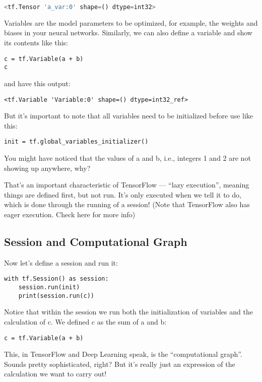 \begin{lstlisting}[language=Python]
<tf.Tensor 'a_var:0' shape=() dtype=int32>
\end{lstlisting}
Variables are the model parameters to be optimized, for example, the weights and biases in your neural networks. Similarly, we can also define a variable and show its contents like this:

\begin{lstlisting}
c = tf.Variable(a + b)
c
\end{lstlisting}
and have this output:

\begin{lstlisting}
<tf.Variable 'Variable:0' shape=() dtype=int32_ref>
\end{lstlisting}
But it's important to note that all variables need to be initialized before use like this:

\begin{lstlisting}
init = tf.global_variables_initializer()
\end{lstlisting}
You might have noticed that the values of a and b, i.e., integers 1 and 2 are not showing up anywhere, why?

That's an important characteristic of TensorFlow --- ``lazy execution'', meaning things are defined first, but not run. It's only executed when we tell it to do, which is done through the running of a session! (Note that TensorFlow also has eager execution. Check here for more info)

\subsection{Session and Computational Graph}

Now let's define a session and run it:

\begin{lstlisting}
with tf.Session() as session:                    
    session.run(init)                            
    print(session.run(c))
\end{lstlisting}
Notice that within the session we run both the initialization of variables and the calculation of c. We defined c as the sum of a and b:

\begin{lstlisting}
c = tf.Variable(a + b)
\end{lstlisting}
This, in TensorFlow and Deep Learning speak, is the ``computational graph''. Sounds pretty sophisticated, right? But it's really just an expression of the calculation we want to carry out!

